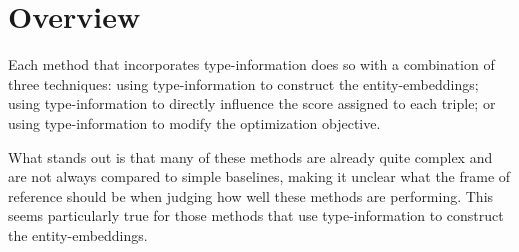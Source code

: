 \section*{Overview}
Each method that incorporates type-information does so with a combination of three techniques:
using type-information to construct the entity-embeddings; using type-information to directly influence the score assigned to each triple; or using type-information to modify the optimization objective.

What stands out is that many of these methods are already quite complex and are not always compared to simple baselines, making it unclear what the frame of reference should be when judging how well these methods are performing. 
This seems particularly true for those methods that use type-information to construct the entity-embeddings.
